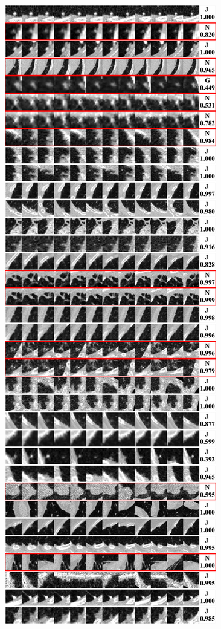 \documentclass[onecolumn]{IEEEtran}
\begin{document}
\begin{figure}[H]
{\includegraphics[width=0.45\columnwidth]{./images/elcap-msnodules-wall1}
}
\end{figure}
\newpage
\end{document}
